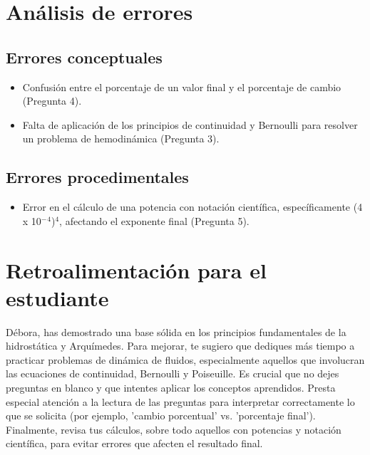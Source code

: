 \documentclass[11pt,a4paper]{article}
\begin{document}
\section*{Análisis de errores}

\subsection*{Errores conceptuales}
\begin{itemize}[leftmargin=1.5em, itemsep=2pt]
  \item Confusión entre el porcentaje de un valor final y el porcentaje de cambio (Pregunta 4).
  \item Falta de aplicación de los principios de continuidad y Bernoulli para resolver un problema de hemodinámica (Pregunta 3).
\end{itemize}

\subsection*{Errores procedimentales}
\begin{itemize}[leftmargin=1.5em, itemsep=2pt]
  \item Error en el cálculo de una potencia con notación científica, específicamente (4 x 10$^{-}$$^{4}$)$^{4}$, afectando el exponente final (Pregunta 5).
\end{itemize}

\section*{Retroalimentación para el estudiante}
\begin{tcolorbox}[cajaRecomendacion, title={Dirigido a: debora echezuria 32585229}]
Débora, has demostrado una base sólida en los principios fundamentales de la hidrostática y Arquímedes. Para mejorar, te sugiero que dediques más tiempo a practicar problemas de dinámica de fluidos, especialmente aquellos que involucran las ecuaciones de continuidad, Bernoulli y Poiseuille. Es crucial que no dejes preguntas en blanco y que intentes aplicar los conceptos aprendidos. Presta especial atención a la lectura de las preguntas para interpretar correctamente lo que se solicita (por ejemplo, 'cambio porcentual' vs. 'porcentaje final'). Finalmente, revisa tus cálculos, sobre todo aquellos con potencias y notación científica, para evitar errores que afecten el resultado final.
\end{tcolorbox}
\end{document}

